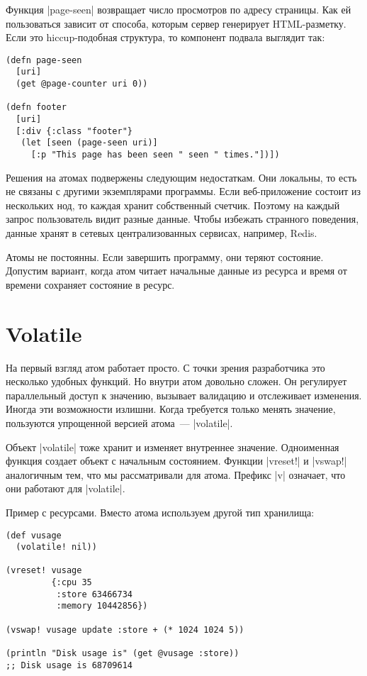 Функция \spverb|page-seen| возвращает число просмотров по адресу страницы. Как ей
пользоваться зависит от способа, которым сервер генерирует HTML-разметку. Если
это hiccup-подобная структура, то компонент подвала выглядит так:

\begin{verbatim}
(defn page-seen
  [uri]
  (get @page-counter uri 0))

(defn footer
  [uri]
  [:div {:class "footer"}
   (let [seen (page-seen uri)]
     [:p "This page has been seen " seen " times."])])
\end{verbatim}

Решения на атомах подвержены следующим недостаткам. Они локальны, то есть не
связаны с другими экземплярами программы. Если веб-приложение состоит из
нескольких нод, то каждая хранит собственный счетчик. Поэтому на каждый запрос
пользователь видит разные данные. Чтобы избежать странного поведения, данные
хранят в сетевых централизованных сервисах, например, Redis.

Атомы не постоянны. Если завершить программу, они теряют состояние. Допустим
вариант, когда атом читает начальные данные из ресурса и время от времени
сохраняет состояние в ресурс.

\section{Volatile}

На первый взгляд атом работает просто. С точки зрения разработчика это несколько
удобных функций. Но внутри атом довольно сложен. Он регулирует параллельный
доступ к значению, вызывает валидацию и отслеживает изменения. Иногда эти
возможности излишни. Когда требуется только менять значение, пользуются
упрощенной версией атома~--- \spverb|volatile|.

Объект \spverb|volatile| тоже хранит и изменяет внутреннее значение. Одноименная
функция создает объект с начальным состоянием. Функции \spverb|vreset!| и \spverb|vswap!|
аналогичным тем, что мы рассматривали для атома. Префикс \spverb|v| означает, что они
работают для \spverb|volatile|.

Пример с ресурсами. Вместо атома используем другой тип хранилища:

\begin{verbatim}
(def vusage
  (volatile! nil))

(vreset! vusage
         {:cpu 35
          :store 63466734
          :memory 10442856})

(vswap! vusage update :store + (* 1024 1024 5))

(println "Disk usage is" (get @vusage :store))
;; Disk usage is 68709614
\end{verbatim}

